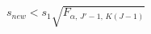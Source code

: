 \documentclass[12pt]{article}
\begin{document}
\pagestyle{empty}
\Large
{}
\pagecolor{ehandbook}

\boldmath
\[
s_{new} < s_1 \sqrt{F_{\alpha, \, J'-1, \, K(J-1)}}
\]
\end{document}
